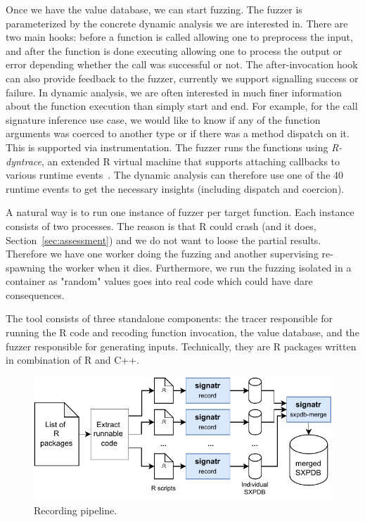 \documentclass[sigplan,anonymous,review]{acmart}
\begin{document}
Once we have the value database, we can start fuzzing.
The fuzzer is parameterized by the concrete dynamic analysis we are interested in.
There are two main hooks: before a function is called allowing one to preprocess the input, and after the function is done executing allowing one to process the output or error depending whether the call was successful or not.
The after-invocation hook can also provide feedback to the fuzzer, currently we support signalling success or failure.
In dynamic analysis, we are often interested in much finer information about the function execution than simply start and end.
For example, for the call signature inference use case, we would like to know if any of the function arguments was coerced to another type or if there was a method dispatch on it.
This is supported via instrumentation.
The fuzzer runs the functions using \emph{R-dyntrace}, an extended R virtual machine that supports attaching callbacks to various runtime events~\cite{goel2019}.
The dynamic analysis can therefore use one of the 40 runtime events to get the necessary insights (including dispatch and coercion).

A natural way is to run one instance of fuzzer per target function.
Each instance consists of two processes.
The reason is that R could crash (and it does, \Cf Section~\ref{sec:assessment}) and we do not want to loose the partial results.
Therefore we have one worker doing the fuzzing and another supervising re-spawning the worker when it dies.
Furthermore, we run the fuzzing isolated in a container as "random" values goes into real code which could have dare consequences.

The tool consists of three standalone components:  the tracer responsible for running the R code and recoding function invocation,  the value database, and  the fuzzer responsible for generating inputs.
Technically, they are R packages written in combination of R and C++.

\begin{figure}
    \centering
    \includegraphics[width=\columnwidth]{code-and-figures/sxdb-pipeline.pdf}
    \caption{
    Recording pipeline.
    }\label{fig:sxpdb-pipeline}
\end{figure}
\end{document}
